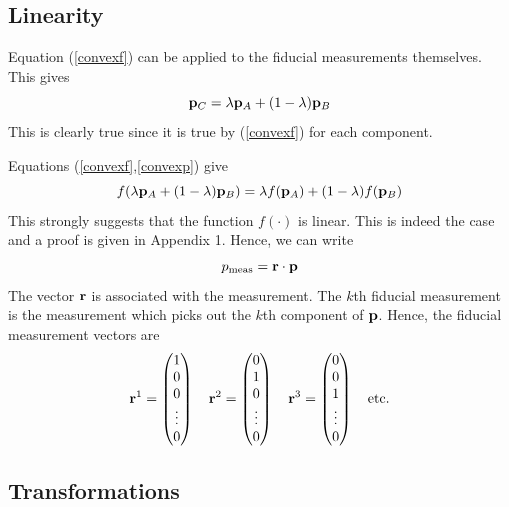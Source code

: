 \documentclass[12pt]{article}
\begin{document}
\subsection{Linearity}

Equation (\ref{convexf}) can be applied to the fiducial measurements
themselves.  This gives
\begin{equation}\label{convexp}
{\bf p}_C = \lambda {\bf p}_A+(1-\lambda){\bf p}_B
\end{equation}
This is clearly true since it is true by (\ref{convexf}) for each component.

Equations (\ref{convexf},\ref{convexp}) give
\begin{equation}\label{convexpf}
f(\lambda {\bf p}_A+(1-\lambda){\bf p}_B)
= \lambda f({\bf p}_A)+(1-\lambda) f({\bf p}_B)
\end{equation}
This strongly suggests that the function $f(\cdot)$ is linear.
This is indeed the case and a proof is given in Appendix 1.
Hence, we can write
\begin{equation}\label{formrp}
p_{\rm meas} = {\bf r} \cdot {\bf p}
\end{equation}
The vector ${\bf r}$ is associated with the measurement.  The $k$th fiducial
measurement is the measurement which picks out the $k$th component of
$\bf p$.  Hence, the fiducial measurement vectors are
\begin{equation}\label{fidM}
{\bf r}^1= \left(
\begin{matrix} 1 \\ 0 \\ 0 \\ \vdots \\ 0 \end{matrix} \right) \quad
{\bf r}^2= \left(
\begin{matrix} 0 \\ 1 \\ 0 \\ \vdots \\ 0 \end{matrix} \right) \quad
{\bf r}^3= \left(
\begin{matrix} 0 \\ 0 \\ 1 \\ \vdots \\ 0 \end{matrix} \right) \quad
{\rm etc.}
\end{equation}


\subsection{Transformations}
\end{document}
